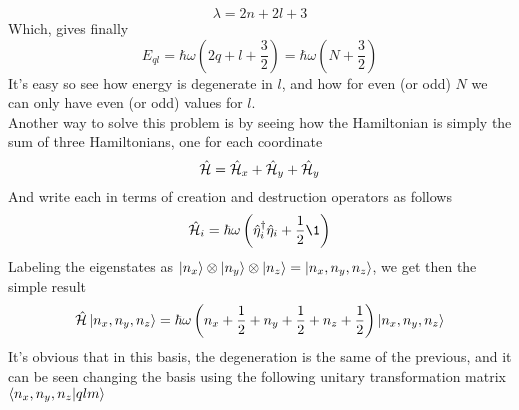 \documentclass[../qm.tex]{subfiles}
\begin{document}
	\begin{equation}
		\lambda=2n+2l+3
		\label{eq:engquant}
	\end{equation}
	Which, gives finally
	\begin{equation}
		E_{ql}=\hbar\omega\left( 2q+l+\frac{3}{2} \right)=\hbar\omega\left( N+\frac{3}{2} \right)
		\label{eq:energy3dqho}
	\end{equation}
	It's easy so see how energy is degenerate in $l$, and how for even (or odd) $N$ we can only have even (or odd) values for $l$.\\
	Another way to solve this problem is by seeing how the Hamiltonian is simply the sum of three Hamiltonians, one for each coordinate
	\begin{equation*}
		\hat{\mathcal{H}}=\hat{\mathcal{H}}_x+\hat{\mathcal{H}}_y+\hat{\mathcal{H}}_y
	\end{equation*}
	And write each in terms of creation and destruction operators as follows
	\begin{equation*}
		\opr{\ham}_i=\hbar\omega\left( \adj{\opr{\eta}}_i\opr{\eta}_i+\frac{1}{2}\1 \right)
	\end{equation*}
	Labeling the eigenstates as $\ket{n_x}\otimes\ket{n_y}\otimes\ket{n_z}=\ket{n_x,n_y,n_z}$, we get then the simple result
	\begin{equation*}
		\hat{\mathcal{H}}\ket{n_x,n_y,n_z}=\hbar\omega\left( n_x+\frac{1}{2}+n_y+\frac{1}{2}+n_z+\frac{1}{2} \right)\ket{n_x,n_y,n_z}
	\end{equation*}
	It's obvious that in this basis, the degeneration is the same of the previous, and it can be seen changing the basis using the following unitary transformation matrix $\bra{n_x,n_y,n_z}\ket{qlm}$
\end{document}
